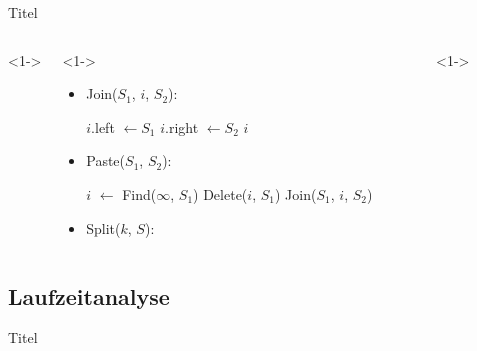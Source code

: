 \documentclass[t]{beamer}
\theoremstyle{plain}
\begin{document}
\begin{frame}{Titel}
    \begin{columns}<1->
    \begin{column}{.65\textwidth}<1->
        \begin{itemize}
            \item<1> Join($S_1$, $i$, $S_2$):
                \begin{algorithm}[H]
                    $i$.left $\gets S_1$ \;
                    $i$.right $\gets S_2$ \;
                    \Return $i$
                \end{algorithm}
            \item<2> Paste($S_1$, $S_2$):
                \begin{algorithm}[H]
                    $i$ $\gets$ Find($\infty$, $S_1$) 
                    Delete($i$, $S_1$) \;
                    \Return Join($S_1$, $i$, $S_2$) \;
                \end{algorithm}
            \item<3> Split($k$, $S$):
                \begin{algorithm}[H]
                \end{algorithm}
        \end{itemize}
    \end{column}
    \begin{column}{.35\textwidth}<1->
        \raisebox{-\totalheight}{
        }
    \end{column}
    \end{columns}
\end{frame}

\subsection{Laufzeitanalyse}
\begin{frame}{Titel}
    
\end{frame}
\end{document}
